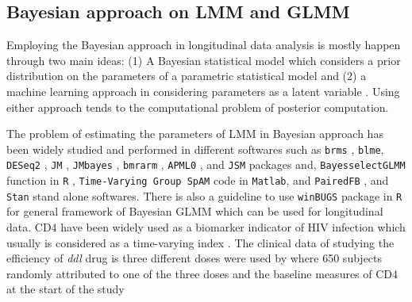 \documentclass[]{article}
\begin{document}
		
		
		\subsection{Bayesian approach on LMM and GLMM}
		
		
		Employing the Bayesian approach in longitudinal data analysis is mostly happen through two main ideas: (1) A Bayesian statistical model \citep[see][Page 9 for the definition of the parametric version]{Robert2007} which considers a prior distribution on the parameters of a parametric statistical model and (2) a machine learning approach in considering parameters as a latent variable \citep{Blei2017}. Using either approach tends to the computational problem of posterior computation. 
		
		The problem of estimating the parameters of LMM in Bayesian approach has been widely studied and performed in different softwares such as \texttt{brms} \citep{brms2021},  \texttt{blme}, \texttt{DESeq2} \citep{Love2014}, \texttt{JM} \citep{Rizopoulos2010}, \texttt{JMbayes} \citep{Rizopoulos2016}, \texttt{bmrarm} \citep{Seedorff2022}, \texttt{APML0} \citep[see the implementation for longitudinal data in][]{Xu2020}, and \texttt{JSM} \citep{Xu2020JSM} packages and, \texttt{BayesselectGLMM} function in \texttt{R} \citep{Ariyo2021}, \texttt{Time-Varying Group SpAM} code in \texttt{Matlab}\citep{MarchettiBowick2016}, and \texttt{PairedFB} \citep{Bian2018}, and \texttt{Stan} \citep{Sorensen2016} stand alone softwares. There is also a guideline to use \texttt{winBUGS} package in \texttt{R} for general framework of Bayesian GLMM which can be used for longitudinal data. 
		CD4 have been widely used as a biomarker indicator of HIV infection which usually is considered as a time-varying index \citep{Tsiatis1995}. The clinical data of studying the efficiency of \textit{ddl} drug is three different doses were used by \cite{LAVALLEY1996} where 650 subjects randomly attributed to one of the three doses and the baseline measures of CD4 at the start of the study 
		
		
\end{document}
